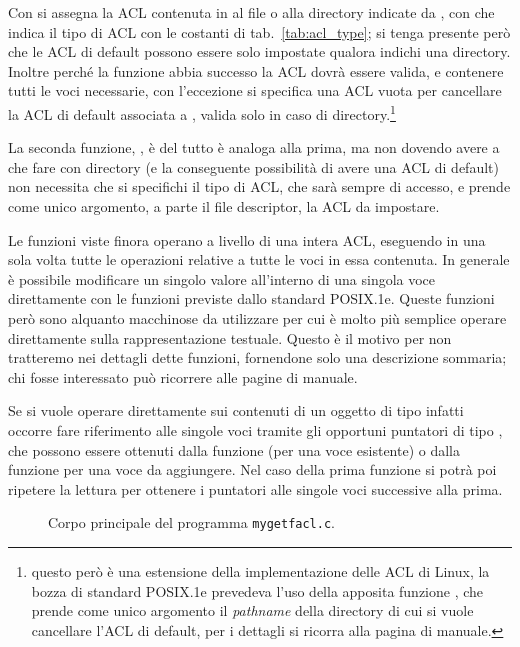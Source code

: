 Con  si assegna la ACL contenuta in  al file o
alla directory indicate da , con  che indica il tipo
di ACL con le costanti di tab.~\ref{tab:acl_type}; si tenga presente però che
le ACL di default possono essere solo impostate qualora  indichi
una directory. Inoltre perché la funzione abbia successo la ACL dovrà essere
valida, e contenere tutti le voci necessarie, con l'eccezione si specifica una
ACL vuota per cancellare la ACL di default associata a , valida
solo in caso di directory.\footnote{questo però è una estensione della
  implementazione delle ACL di Linux, la bozza di standard POSIX.1e prevedeva
  l'uso della apposita funzione , che prende
  come unico argomento il \textit{pathname} della directory di cui si vuole
  cancellare l'ACL di default, per i dettagli si ricorra alla pagina di
  manuale.}

La seconda funzione, , è del tutto è analoga alla prima, ma
non dovendo avere a che fare con directory (e la conseguente possibilità di
avere una ACL di default) non necessita che si specifichi il tipo di ACL, che
sarà sempre di accesso, e prende come unico argomento, a parte il file
descriptor, la ACL da impostare.

Le funzioni viste finora operano a livello di una intera ACL, eseguendo in una
sola volta tutte le operazioni relative a tutte le voci in essa contenuta. In
generale è possibile modificare un singolo valore all'interno di una singola
voce direttamente con le funzioni previste dallo standard POSIX.1e.  Queste
funzioni però sono alquanto macchinose da utilizzare per cui è molto più
semplice operare direttamente sulla rappresentazione testuale. Questo è il
motivo per non tratteremo nei dettagli dette funzioni, fornendone solo una
descrizione sommaria; chi fosse interessato può ricorrere alle pagine di
manuale.

Se si vuole operare direttamente sui contenuti di un oggetto di tipo
 infatti occorre fare riferimento alle singole voci tramite gli
opportuni puntatori di tipo , che possono essere ottenuti
dalla funzione  (per una voce esistente) o dalla
funzione  per una voce da aggiungere. Nel caso della
prima funzione si potrà poi ripetere la lettura per ottenere i puntatori alle
singole voci successive alla prima.

\begin{figure}[!htb]
  \footnotesize \centering
  \begin{minipage}[c]{\codesamplewidth}
  \end{minipage} 
  \normalsize
  \caption{Corpo principale del programma \texttt{mygetfacl.c}.}
  \label{fig:proc_mygetfacl}
\end{figure}

